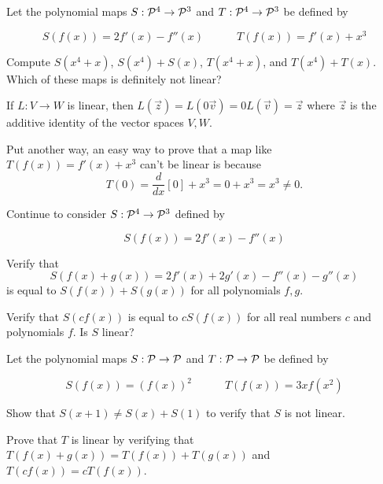 \begin{applicationActivities}
\begin{activity}{10}
Let the polynomial maps \(S: \P^4 \rightarrow \P^3\)
and \(T: \P^4 \rightarrow \P^3\) be defined by

\[S(f(x)) = 2f'(x)-f''(x) \hspace{3em} T(f(x)) = f'(x)+x^3\]

Compute \(S(x^4+x)\), \(S(x^4)+S(x)\), \(T(x^4+x)\), and \(T(x^4)+T(x)\).
Which of these maps is definitely not linear?
\end{activity}


\begin{fact}
If \(L:V\to W\) is linear, then \(L(\vec z)=L(0\vec v)=0L(\vec v)=\vec z\)
where \(\vec z\) is the additive identity of the vector spaces \(V,W\).

\vspace{1em}

Put another way, an easy way to prove that a map like
\(T(f(x)) = f'(x)+x^3\) can't be linear is because
\[T(0)=\frac{d}{dx}[0]+x^3=0+x^3=x^3\not=0.\]
\end{fact}

\begin{activity}{15}
Continue to consider \(S: \P^4 \rightarrow \P^3\) defined by

\[S(f(x)) = 2f'(x)-f''(x)\]

\begin{subactivity}
  Verify that
  \[S(f(x)+g(x))=2f'(x)+2g'(x)-f''(x)-g''(x)\]
  is equal to \(S(f(x))+S(g(x))\) for all polynomials \(f,g\).
\end{subactivity}
\begin{subactivity}
  Verify that \(S(cf(x))\) is equal to \(cS(f(x))\) for all real numbers \(c\)
  and polynomials \(f\). Is \(S\) linear?
\end{subactivity}
\end{activity}


\begin{activity}{20}
Let the polynomial maps \(S: \P \rightarrow \P\)
and \(T: \P \rightarrow \P\) be defined by

\[S(f(x)) = (f(x))^2 \hspace{3em} T(f(x)) = 3xf(x^2)\]

\begin{subactivity}
Show that \(S(x+1)\not= S(x)+S(1)\) to verify that \(S\) is not linear.
\end{subactivity}
\begin{subactivity}
Prove that \(T\) is linear by verifying that \(T(f(x)+g(x))=T(f(x))+T(g(x))\)
and \(T(cf(x))=cT(f(x))\).
\end{subactivity}
\end{activity}


\end{applicationActivities}
